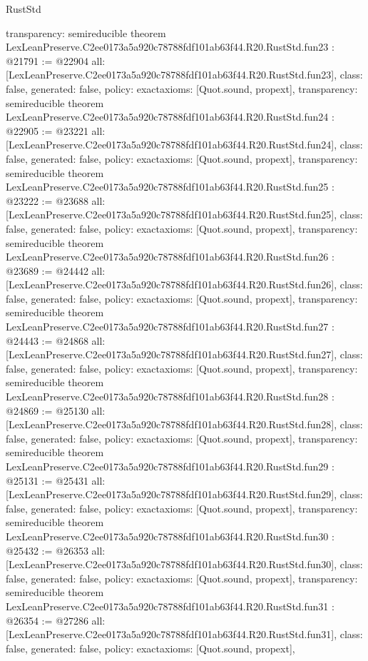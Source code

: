 \begin{lexlean}{RustStd}
\begin{coremodule}
{  transparency: semireducible
}
theorem LexLeanPreserve.C2ee0173a5a920c78788fdf101ab63f44.R20.RustStd.fun23 : @21791 := @22904 {
  all: [LexLeanPreserve.C2ee0173a5a920c78788fdf101ab63f44.R20.RustStd.fun23],
  class: false,
  generated: false,
  policy: exact{axioms: [Quot.sound, propext]},
  transparency: semireducible
}
theorem LexLeanPreserve.C2ee0173a5a920c78788fdf101ab63f44.R20.RustStd.fun24 : @22905 := @23221 {
  all: [LexLeanPreserve.C2ee0173a5a920c78788fdf101ab63f44.R20.RustStd.fun24],
  class: false,
  generated: false,
  policy: exact{axioms: [Quot.sound, propext]},
  transparency: semireducible
}
theorem LexLeanPreserve.C2ee0173a5a920c78788fdf101ab63f44.R20.RustStd.fun25 : @23222 := @23688 {
  all: [LexLeanPreserve.C2ee0173a5a920c78788fdf101ab63f44.R20.RustStd.fun25],
  class: false,
  generated: false,
  policy: exact{axioms: [Quot.sound, propext]},
  transparency: semireducible
}
theorem LexLeanPreserve.C2ee0173a5a920c78788fdf101ab63f44.R20.RustStd.fun26 : @23689 := @24442 {
  all: [LexLeanPreserve.C2ee0173a5a920c78788fdf101ab63f44.R20.RustStd.fun26],
  class: false,
  generated: false,
  policy: exact{axioms: [Quot.sound, propext]},
  transparency: semireducible
}
theorem LexLeanPreserve.C2ee0173a5a920c78788fdf101ab63f44.R20.RustStd.fun27 : @24443 := @24868 {
  all: [LexLeanPreserve.C2ee0173a5a920c78788fdf101ab63f44.R20.RustStd.fun27],
  class: false,
  generated: false,
  policy: exact{axioms: [Quot.sound, propext]},
  transparency: semireducible
}
theorem LexLeanPreserve.C2ee0173a5a920c78788fdf101ab63f44.R20.RustStd.fun28 : @24869 := @25130 {
  all: [LexLeanPreserve.C2ee0173a5a920c78788fdf101ab63f44.R20.RustStd.fun28],
  class: false,
  generated: false,
  policy: exact{axioms: [Quot.sound, propext]},
  transparency: semireducible
}
theorem LexLeanPreserve.C2ee0173a5a920c78788fdf101ab63f44.R20.RustStd.fun29 : @25131 := @25431 {
  all: [LexLeanPreserve.C2ee0173a5a920c78788fdf101ab63f44.R20.RustStd.fun29],
  class: false,
  generated: false,
  policy: exact{axioms: [Quot.sound, propext]},
  transparency: semireducible
}
theorem LexLeanPreserve.C2ee0173a5a920c78788fdf101ab63f44.R20.RustStd.fun30 : @25432 := @26353 {
  all: [LexLeanPreserve.C2ee0173a5a920c78788fdf101ab63f44.R20.RustStd.fun30],
  class: false,
  generated: false,
  policy: exact{axioms: [Quot.sound, propext]},
  transparency: semireducible
}
theorem LexLeanPreserve.C2ee0173a5a920c78788fdf101ab63f44.R20.RustStd.fun31 : @26354 := @27286 {
  all: [LexLeanPreserve.C2ee0173a5a920c78788fdf101ab63f44.R20.RustStd.fun31],
  class: false,
  generated: false,
  policy: exact{axioms: [Quot.sound, propext]},
}
\end{coremodule}
\end{lexlean}
